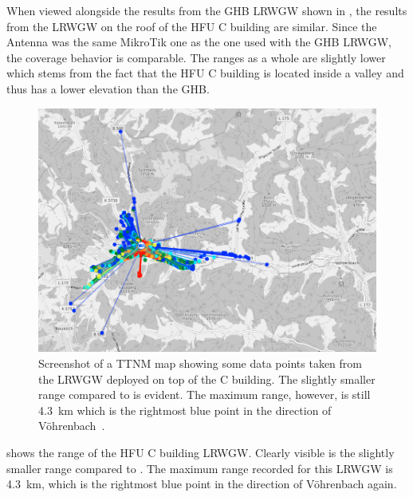 When viewed alongside the results from the \ac{GHB} \acl{LRWGW} shown in , the results from the \acl{LRWGW} on the roof of the \ac{HFU} C building are similar.
Since the Antenna was the same MikroTik one as the one used with the \ac{GHB} \acl{LRWGW}, the coverage behavior is comparable.
The ranges as a whole are slightly lower which stems from the fact that the \ac{HFU} C building is located inside a valley and thus has a lower elevation than the \ac{GHB}.

\begin{figure}[htbp]
    \centering
    \includegraphics[width=1\textwidth]{pictures/ttn-mapper/gateway-ranges/c_building_gw_range.png}
    \caption[Screenshot of a \acl{TTNM} map showing some data points taken from the \acl{LRWGW} deployed on top of the C building]{
        Screenshot of a \ac{TTNM} map showing some data points taken from the \acl{LRWGW} deployed on top of the C building.
        The slightly smaller range compared to  is evident.
        The maximum range, however, is still \SI{4.3}{\kilo\meter} which is the rightmost blue point in the direction of Vöhrenbach~\cite{ttn_mapper_ttn_2023}.
    }\label{pic:c_building_gw_range}
\end{figure}

 shows the range of the \ac{HFU} C building \acl{LRWGW}.
Clearly visible is the slightly smaller range compared to .
The maximum range recorded for this \acl{LRWGW} is \SI{4.3}{\kilo\meter}, which is the rightmost blue point in the direction of Vöhrenbach again.

